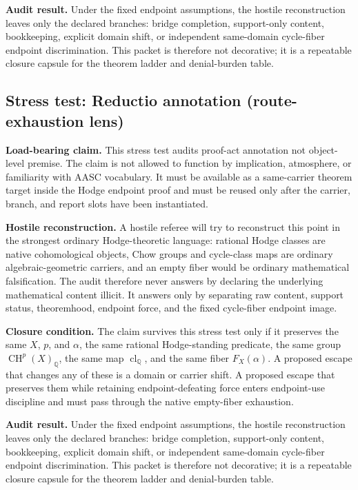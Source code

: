 \documentclass[11pt]{article}
\newcommand{\QQ}{\mathbb{Q}}
\newcommand{\CH}{\operatorname{CH}}
\newcommand{\clQ}{\operatorname{cl}_{\QQ}}
\begin{document}
\par\noindent\textbf{Audit result.} Under the fixed endpoint assumptions, the hostile reconstruction leaves only the declared branches: bridge completion, support-only content, bookkeeping, explicit domain shift, or independent same-domain cycle-fiber endpoint discrimination. This packet is therefore not decorative; it is a repeatable closure capsule for the theorem ladder and denial-burden table.


\subsection{Stress test: Reductio annotation (route-exhaustion lens)}

\par\noindent\textbf{Load-bearing claim.} This stress test audits proof-act annotation not object-level premise. The claim is not allowed to function by implication, atmosphere, or familiarity with AASC vocabulary. It must be available as a same-carrier theorem target inside the Hodge endpoint proof and must be reused only after the carrier, branch, and report slots have been instantiated.

\par\noindent\textbf{Hostile reconstruction.} A hostile referee will try to reconstruct this point in the strongest ordinary Hodge-theoretic language: rational Hodge classes are native cohomological objects, Chow groups and cycle-class maps are ordinary algebraic-geometric carriers, and an empty fiber would be ordinary mathematical falsification. The audit therefore never answers by declaring the underlying mathematical content illicit. It answers only by separating raw content, support status, theoremhood, endpoint force, and the fixed cycle-fiber endpoint image.

\par\noindent\textbf{Closure condition.} The claim survives this stress test only if it preserves the same $X$, $p$, and $\alpha$, the same rational Hodge-standing predicate, the same group $\CH^p(X)_\QQ$, the same map $\clQ$, and the same fiber $F_X(\alpha)$. A proposed escape that changes any of these is a domain or carrier shift. A proposed escape that preserves them while retaining endpoint-defeating force enters endpoint-use discipline and must pass through the native empty-fiber exhaustion.

\par\noindent\textbf{Audit result.} Under the fixed endpoint assumptions, the hostile reconstruction leaves only the declared branches: bridge completion, support-only content, bookkeeping, explicit domain shift, or independent same-domain cycle-fiber endpoint discrimination. This packet is therefore not decorative; it is a repeatable closure capsule for the theorem ladder and denial-burden table.
\end{document}
